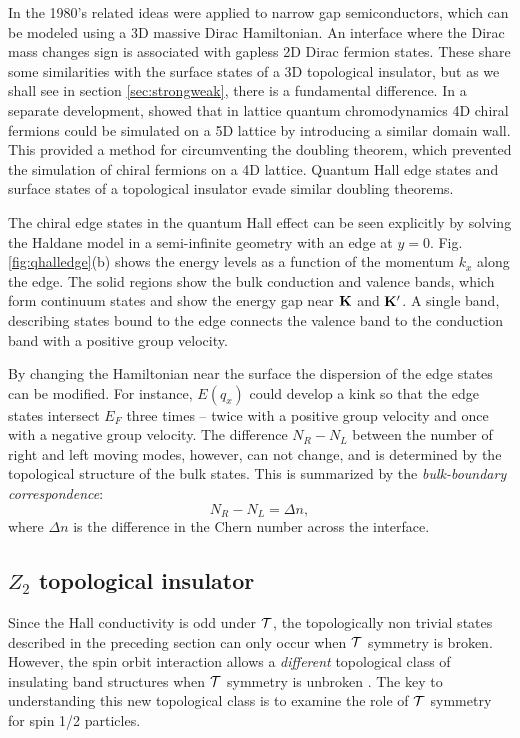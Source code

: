 \documentclass[twocolumn,floatfix,showpacs,rmp,aps]{revtex4}
\begin{document}
In the 1980's related ideas were applied to narrow gap
semiconductors,
which can be modeled using a 3D massive Dirac Hamiltonian\cite{volkov85,fradkin86}.
An interface where the Dirac mass changes sign is associated with gapless 2D
Dirac fermion states.  These share some similarities with
the surface states of a 3D topological insulator, but as we shall see in
section \ref{sec:strongweak}, there is a fundamental difference.
In a separate development, \textcite{kaplan92} showed that in lattice
quantum chromodynamics 4D chiral fermions could be simulated on
a 5D lattice by introducing a similar domain wall.  This provided a method for circumventing the
doubling theorem\cite{nielssen83}, which prevented the simulation of
chiral fermions on a 4D lattice.  Quantum Hall edge states and surface states
of a topological insulator evade similar doubling theorems.

The chiral edge states in the quantum Hall effect can be seen explicitly by solving
the Haldane model in a semi-infinite geometry with an edge at $y=0$.  Fig.
\ref{fig:qhalledge}(b) shows the energy levels as a function of the momentum
$k_x$ along the edge.  The solid regions show the bulk conduction and
valence bands, which form continuum states and show the energy gap
near ${\bf K}$ and ${\bf K}'$.  A single band, describing states
bound to the edge connects the
valence band to the conduction band with a positive group velocity.

By changing the Hamiltonian near the surface the dispersion
of the edge states can be modified.  For instance, $E(q_x)$ could
develop a kink so that the edge states intersect $E_F$
three times -- twice with a positive group velocity and once with a
negative group velocity.  The difference $N_R-N_L$ between the number of right
and left moving modes, however,
can not change, and is determined by the topological structure of
the bulk states.  This is summarized by the {\it bulk-boundary
correspondence}:
\begin{equation}
N_R-N_L = \Delta n,
\label{bulkboundary}
\end{equation}
where $\Delta n$ is the difference in the Chern number across the interface.



\subsection{$Z_2$ topological insulator}
\label{sec:z2topo}

Since the Hall conductivity
is odd under ${\cal T}$, the topologically non trivial
states described in the preceding section
can only occur when ${\cal T}$ symmetry is broken.
However, the spin orbit interaction allows
a {\it different} topological class of insulating band structures when ${\cal T}$
 symmetry is unbroken \cite{kanemele05a}.  The key to understanding this new
topological class is to examine the role of ${\cal T}$ symmetry
for spin 1/2 particles.
\end{document}
